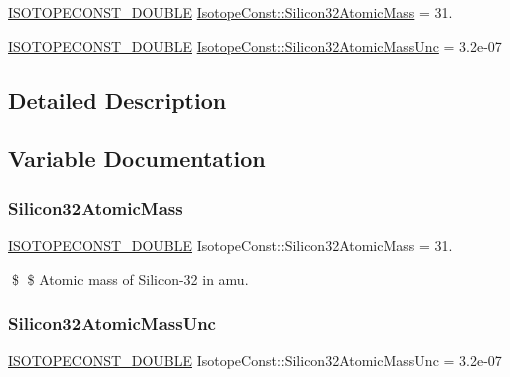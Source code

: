 \begin{DoxyCompactItemize}
\item 
\mbox{\hyperlink{group___isotope_const-_macros_ga8f45a7272ce02c0b4c65c44636ed719a}{I\+S\+O\+T\+O\+P\+E\+C\+O\+N\+S\+T\+\_\+\+D\+O\+U\+B\+LE}} \mbox{\hyperlink{group___isotope_const-_silicon-_si32_ga5163af36c1b1e5b5bd6a892a0b731647}{Isotope\+Const\+::\+Silicon32\+Atomic\+Mass}} = 31.
\item 
\mbox{\hyperlink{group___isotope_const-_macros_ga8f45a7272ce02c0b4c65c44636ed719a}{I\+S\+O\+T\+O\+P\+E\+C\+O\+N\+S\+T\+\_\+\+D\+O\+U\+B\+LE}} \mbox{\hyperlink{group___isotope_const-_silicon-_si32_gaaea8818be089d02dac449dc54bfa66a1}{Isotope\+Const\+::\+Silicon32\+Atomic\+Mass\+Unc}} = 3.\+2e-\/07
\end{DoxyCompactItemize}


\subsection{Detailed Description}


\subsection{Variable Documentation}
\mbox{\label{group___isotope_const-_silicon-_si32_ga5163af36c1b1e5b5bd6a892a0b731647}} 
\subsubsection{\texorpdfstring{Silicon32\+Atomic\+Mass}{Silicon32AtomicMass}}
{\footnotesize\ttfamily \mbox{\hyperlink{group___isotope_const-_macros_ga8f45a7272ce02c0b4c65c44636ed719a}{I\+S\+O\+T\+O\+P\+E\+C\+O\+N\+S\+T\+\_\+\+D\+O\+U\+B\+LE}} Isotope\+Const\+::\+Silicon32\+Atomic\+Mass = 31.}

\$ \$ Atomic mass of Silicon-\/32 in amu. \mbox{\label{group___isotope_const-_silicon-_si32_gaaea8818be089d02dac449dc54bfa66a1}} 
\subsubsection{\texorpdfstring{Silicon32\+Atomic\+Mass\+Unc}{Silicon32AtomicMassUnc}}
{\footnotesize\ttfamily \mbox{\hyperlink{group___isotope_const-_macros_ga8f45a7272ce02c0b4c65c44636ed719a}{I\+S\+O\+T\+O\+P\+E\+C\+O\+N\+S\+T\+\_\+\+D\+O\+U\+B\+LE}} Isotope\+Const\+::\+Silicon32\+Atomic\+Mass\+Unc = 3.\+2e-\/07}

